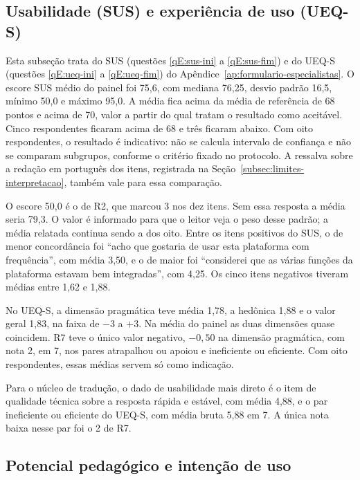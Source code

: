 \subsection{Usabilidade (SUS) e experiência de uso (UEQ-S)}
\label{sec:resultado-usabilidade}

Esta subseção trata do SUS (questões \ref{qE:sus-ini} a \ref{qE:sus-fim}) e do UEQ-S (questões \ref{qE:ueq-ini} a \ref{qE:ueq-fim}) do Apêndice~\ref{ap:formulario-especialistas}. O escore SUS médio do painel foi 75,6, com mediana 76,25, desvio padrão 16,5, mínimo 50,0 e máximo 95,0. A média fica acima da média de referência de 68 pontos \cite{sauro2012} e acima de 70, valor a partir do qual  tratam o resultado como aceitável. Cinco respondentes ficaram acima de 68 e três ficaram abaixo. Com oito respondentes, o resultado é indicativo: não se calcula intervalo de confiança e não se comparam subgrupos, conforme o critério fixado no protocolo. A ressalva sobre a redação em português dos itens, registrada na Seção~\ref{subsec:limites-interpretacao}, também vale para essa comparação.

O escore 50,0 é o de R2, que marcou 3 nos dez itens. Sem essa resposta a média seria 79,3. O valor é informado para que o leitor veja o peso desse padrão; a média relatada continua sendo a dos oito. Entre os itens positivos do SUS, o de menor concordância foi ``acho que gostaria de usar esta plataforma com frequência'', com média 3,50, e o de maior foi ``considerei que as várias funções da plataforma estavam bem integradas'', com 4,25. Os cinco itens negativos tiveram médias entre 1,62 e 1,88.

No UEQ-S, a dimensão pragmática teve média 1,78, a hedônica 1,88 e o valor geral 1,83, na faixa de $-3$ a $+3$. Na média do painel as duas dimensões quase coincidem. R7 teve o único valor negativo, $-0,50$ na dimensão pragmática, com nota 2, em 7, nos pares atrapalhou ou apoiou e ineficiente ou eficiente. Com oito respondentes, essas médias servem só como indicação.

Para o núcleo de tradução, o dado de usabilidade mais direto é o item de qualidade técnica sobre a resposta rápida e estável, com média 4,88, e o par ineficiente ou eficiente do UEQ-S, com média bruta 5,88 em 7. A única nota baixa nesse par foi o 2 de R7.

\subsection{Potencial pedagógico e intenção de uso}
\label{sec:resultado-pedagogico}

